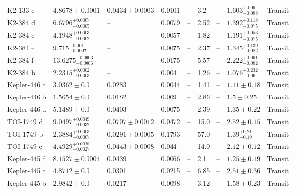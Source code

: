 \begin{tabular}{llllllllll}
K2-133 c & $4.8678 \pm 0.0001$ & $0.0434 \pm 0.0003$ & 0.0101 & -- & 3.2 & -- & $1.603^{+0.09}_{-0.088}$ & Transit & \cite{WELLS_ET_AL__2019} \\
K2-384 d & $6.6796^{+0.0007}_{-0.0005}$ & -- & 0.0079 & -- & 2.52 & -- & $1.392^{+0.118}_{-0.075}$ & Transit & \cite{CHRISTIANSEN_ET_AL_2022} \\
K2-384 c & $4.1948^{+0.0003}_{-0.0002}$ & -- & 0.0057 & -- & 1.82 & -- & $1.191^{+0.053}_{-0.075}$ & Transit & \cite{CHRISTIANSEN_ET_AL_2022} \\
K2-384 e & $9.715^{+0.001}_{-0.0007}$ & -- & 0.0075 & -- & 2.37 & -- & $1.345^{+0.139}_{-0.082}$ & Transit & \cite{CHRISTIANSEN_ET_AL_2022} \\
K2-384 f & $13.6275^{+0.0003}_{-0.0006}$ & -- & 0.0175 & -- & 5.57 & -- & $2.222^{+0.091}_{-0.082}$ & Transit & \cite{CHRISTIANSEN_ET_AL_2022} \\
K2-384 b & $2.2315^{+0.0002}_{-0.0003}$ & -- & 0.004 & -- & 1.26 & -- & $1.076^{+0.232}_{-0.06}$ & Transit & \cite{CHRISTIANSEN_ET_AL_2022} \\
Kepler-446 c & $3.0362 \pm 0.0$ & 0.0283 & 0.0044 & -- & 1.41 & -- & $1.11 \pm 0.18$ & Transit & \cite{MUIRHEAD_ET_AL__2015} \\
Kepler-446 b & $1.5654 \pm 0.0$ & 0.0182 & 0.009 & -- & 2.86 & -- & $1.5 \pm 0.25$ & Transit & \cite{MUIRHEAD_ET_AL__2015} \\
Kepler-446 d & $5.1489 \pm 0.0$ & 0.0403 & 0.0075 & -- & 2.39 & -- & $1.35 \pm 0.22$ & Transit & \cite{MUIRHEAD_ET_AL__2015} \\
TOI-1749 d & $9.0497^{+0.0049}_{-0.0032}$ & $0.0707 \pm 0.0012$ & 0.0472 & -- & 15.0 & -- & $2.52 \pm 0.15$ & Transit & \cite{FUKUI_ET_AL__2021} \\
TOI-1749 b & $2.3884^{+0.0003}_{-0.0007}$ & $0.0291 \pm 0.0005$ & 0.1793 & -- & 57.0 & -- & $1.39^{+0.21}_{-0.19}$ & Transit & \cite{FUKUI_ET_AL__2021} \\
TOI-1749 c & $4.4929^{+0.0038}_{-0.0027}$ & $0.0443 \pm 0.0008$ & 0.044 & -- & 14.0 & -- & $2.12 \pm 0.12$ & Transit & \cite{FUKUI_ET_AL__2021} \\
Kepler-445 d & $8.1527 \pm 0.0004$ & 0.0439 & 0.0066 & -- & 2.1 & -- & $1.25 \pm 0.19$ & Transit & \cite{MUIRHEAD_ET_AL__2015} \\
Kepler-445 c & $4.8712 \pm 0.0$ & 0.0301 & 0.0215 & -- & 6.85 & -- & $2.51 \pm 0.36$ & Transit & \cite{MUIRHEAD_ET_AL__2015} \\
Kepler-445 b & $2.9842 \pm 0.0$ & 0.0217 & 0.0098 & -- & 3.12 & -- & $1.58 \pm 0.23$ & Transit & \cite{MUIRHEAD_ET_AL__2015} \\

\end{tabular}
